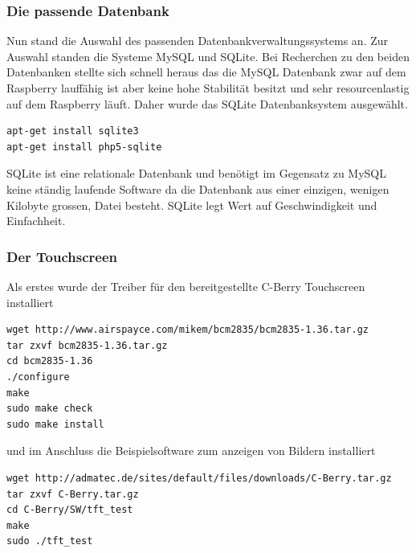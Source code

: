 \documentclass[11pt,a4paper]{article} %
\begin{document}
\subsubsection{Die passende Datenbank}
Nun stand die Auswahl des passenden Datenbankverwaltungssystems an. Zur Auswahl standen die Systeme MySQL und SQLite. Bei Recherchen zu den beiden Datenbanken stellte sich schnell heraus das die MySQL Datenbank zwar auf dem Raspberry lauffähig ist aber keine hohe Stabilität besitzt und sehr resourcenlastig auf dem Raspberry läuft. Daher wurde das SQLite Datenbanksystem ausgewählt.
\begin{frame}

\begin{lstlisting}
apt-get install sqlite3
apt-get install php5-sqlite
\end{lstlisting}

\end{frame}
 SQLite ist eine relationale Datenbank und benötigt im Gegensatz zu MySQL keine ständig laufende Software da die Datenbank aus einer einzigen, wenigen Kilobyte grossen, Datei besteht. SQLite  legt Wert auf Geschwindigkeit und Einfachheit.
\par
\subsubsection{Der Touchscreen}
Als erstes wurde der Treiber für den bereitgestellte C-Berry Touchscreen installiert \cite{5}
\begin{frame}

\begin{lstlisting}
wget http://www.airspayce.com/mikem/bcm2835/bcm2835-1.36.tar.gz
tar zxvf bcm2835-1.36.tar.gz
cd bcm2835-1.36
./configure
make
sudo make check
sudo make install
\end{lstlisting}

\end{frame}
und im Anschluss die Beispielsoftware zum anzeigen von Bildern installiert
\begin{frame}

\begin{lstlisting}
wget http://admatec.de/sites/default/files/downloads/C-Berry.tar.gz
tar zxvf C-Berry.tar.gz
cd C-Berry/SW/tft_test
make
sudo ./tft_test
\end{lstlisting}

\end{frame}
\end{document}
